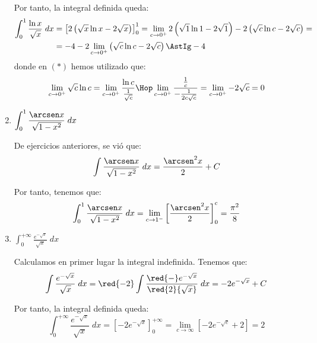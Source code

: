 \begin{ejercicio}
\begin{enumerate}
    Por tanto, la integral definida queda:
    \begin{align*}
        \int_{0}^{1} \frac{\ln x}{\sqrt{x}}\;dx 
        &= \left[2\left(\sqrt{x}\ln x - 2\sqrt{x}\right)\right]_{0}^{1}
        = \lim_{c\to 0^+}2\left(\sqrt{1}\ln 1 - 2\sqrt{1}\right) - 2\left(\sqrt{c}\ln c - 2\sqrt{c}\right) =\\
        &= -4 -2\lim_{c\to 0^+}\left(\sqrt{c}\ln c - 2\sqrt{c}\right) \AstIg -4
    \end{align*}
    donde en $(\ast)$ hemos utilizado que:
    \begin{equation*}
        \lim_{c\to 0^+}\sqrt{c}\ln c
        = \lim_{c\to 0^+}\frac{\ln c}{\frac{1}{\sqrt{c}}}
         \Hop \lim_{c\to 0^+}\frac{\frac{1}{c}}{-\frac{1}{2c\sqrt{c}}}
         = \lim_{c\to 0^+}-2\sqrt{c} = 0
    \end{equation*}


    \item $\displaystyle \int_{0}^{1} \frac{\arcsen x}{\sqrt{1-x^2}}\;dx$
    
    De ejercicios anteriores, se vió que:
    \begin{equation*}
        \int \frac{\arcsen x}{\sqrt{1-x^2}}\;dx = \frac{\arcsen^2 x}{2} + C
    \end{equation*}

    Por tanto, tenemos que:
    \begin{equation*}
        \int_{0}^{1} \frac{\arcsen x}{\sqrt{1-x^2}}\;dx
        = \lim _{c\to 1^-}\left[\frac{\arcsen^2 x}{2}\right]_{0}^{c}
        = \frac{\pi^2}{8}
    \end{equation*}

    \item $\displaystyle \int_{0}^{+\infty} \frac{e^{-\sqrt{x}}}{\sqrt{x}}\;dx$
    
    Calculamos en primer lugar la integral indefinida. Tenemos que:
    \begin{equation*}
        \int \frac{e^{-\sqrt{x}}}{\sqrt{x}}\;dx
        = \red{-2} \int \frac{\red{-}e^{-\sqrt{x}}}{\red{2}{\sqrt{x}}}\;dx = -2e^{-\sqrt{x}}+C
    \end{equation*}

    Por tanto, la integral definida queda:
    \begin{equation*}
        \int_{0}^{+\infty} \frac{e^{-\sqrt{x}}}{\sqrt{x}}\;dx
        = \left[-2e^{-\sqrt{x}}\right]_{0}^{+\infty}
        = \lim_{c\to \infty}\left[-2e^{-\sqrt{c}}+2\right]
        = 2
    \end{equation*}
    
\end{enumerate}
\end{ejercicio}

